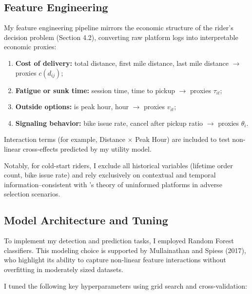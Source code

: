 \documentclass[12pt,letterpaper]{article}
\begin{document}
\subsection{Feature Engineering}

My feature engineering pipeline mirrors the economic structure of the rider's decision problem (Section 4.2), converting raw platform logs into interpretable economic proxies:

\begin{enumerate}
    \item \textbf{Cost of delivery:} total distance, first mile distance, last mile distance $\rightarrow$ proxies $c(d_{ij})$;
    \item \textbf{Fatigue or sunk time:} session time, time to pickup $\rightarrow$ proxies $\tau_{it}$;
    \item \textbf{Outside options:} is peak hour, hour $\rightarrow$ proxies $v_{it}$;
    \item \textbf{Signaling behavior:} bike issue rate, cancel after pickup ratio $\rightarrow$ proxies $\theta_i$.
\end{enumerate}

Interaction terms (for example, Distance $\times$ Peak Hour) are included to test non-linear cross-effects predicted by my utility model.

Notably, for cold-start riders, I exclude all historical variables (lifetime order count, bike issue rate) and rely exclusively on contextual and temporal information--consistent with \citeauthor{akerlof1970lemons}'s theory of uninformed platforms in adverse selection scenarios.

\subsection{Model Architecture and Tuning}

To implement my detection and prediction tasks, I employed Random Forest classifiers. This modeling choice is supported by Mullainathan and Spiess (2017), who highlight its ability to capture non-linear feature interactions without overfitting in moderately sized datasets.

I tuned the following key hyperparameters using grid search and cross-validation:
\end{document}

